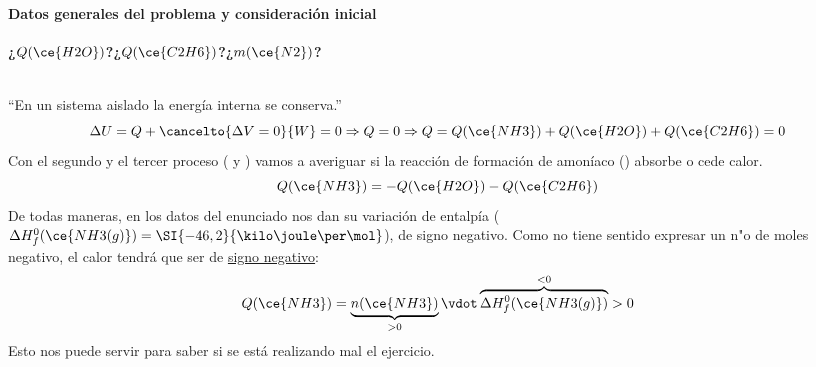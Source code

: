
\begin{frame}
	\frametitle{\ejerciciocmd}
	\framesubtitle{Datos generales del problema y consideración inicial}
	\begin{center}
		\textbf{\huge¿$Q(\ce{H2O})$?\quad¿$Q(\ce{C2H6})$?\quad¿$m(\ce{N2})$?}\\[.2cm]
		\\[.2cm]
	\end{center}
	 ``En un sistema aislado la energía interna se conserva.''
	$$
		\Delta U = Q + \cancelto{\Delta V = 0}{W} = 0\Rightarrow Q = 0\Rightarrow Q =
		Q(\ce{NH3}) + Q(\ce{H2O}) + Q(\ce{C2H6}) = 0
	$$
	Con el segundo y el tercer proceso ( y ) vamos a averiguar si la reacción de formación de amoníaco () absorbe o cede calor.
	$$
		Q(\ce{NH3}) = 	-Q(\ce{H2O}) -Q(\ce{C2H6})
	$$
	De todas maneras, en los datos del enunciado nos dan su variación de entalpía ($\Delta H_f^0(\ce{NH3(g)}) = \SI{-46,2}{\kilo\joule\per\mol}$), de signo negativo. Como no tiene sentido expresar un n"o de moles negativo, el calor tendrá que ser de \underline{signo negativo}:
	$$
		Q(\ce{NH3}) = \underbrace{n(\ce{NH3})}_{>0}\vdot\overbrace{\Delta H_f^0(\ce{NH3(g)})}^{<0}>0
	$$
	Esto nos puede servir para saber si se está realizando mal el ejercicio.
\end{frame}

